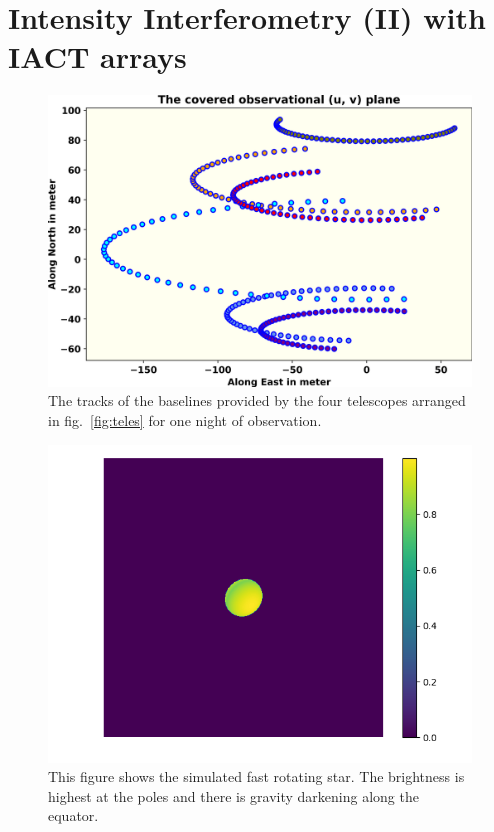 \section{Intensity Interferometry (II) with IACT arrays}
\begin{figure}
  \includegraphics[width=\linewidth]{fig/baseline.png}
  \caption{The tracks of the baselines provided by the four telescopes arranged in fig.~\ref{fig:teles} for one night of observation.}
  \label{fig:base}
\end{figure}
\begin{figure}[hbt]
  \includegraphics[width=\linewidth]{fig/ellipse/ellipse1612.png}
  \caption{This figure shows the simulated fast rotating star. The brightness is highest at the poles and there is gravity darkening along the equator.}
  \label{fig:image}
\end{figure}
